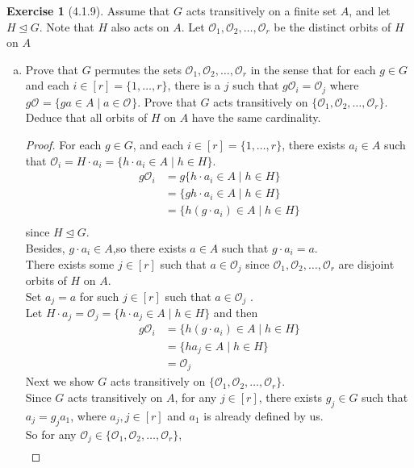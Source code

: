 \documentclass{amsart}
\theoremstyle{plain}
\theoremstyle{definition}
\newtheorem{exer}[lem]{Exercise}
\newcommand{\OO}[1]{\mathcal{O}_{#1}}
\begin{document}
\begin{exer}[4.1.9]
Assume that $G$ acts transitively on a finite set $A$, and let $H\unlhd G$.
Note that $H$ also acts on $A$. 
Let $\OO{1}, \OO 2,\ldots,\OO r$ be the distinct orbits of $H$ on $A$
\begin{enumerate}[(a)]
\item Prove that $G$ permutes the sets $\OO{1}, \OO 2,\ldots,\OO r$ in the sense that for each $g\in G$
and each $i\in[r]=\{1,\ldots,r\}$, there is a $j$ such that $g\OO i=\OO j$ where $g\OO{}=\{ga\in A\mid a\in\OO{}\}$.
Prove that $G$ acts transitively on $\{\OO{1}, \OO 2,\ldots,\OO r\}$. Deduce that all orbits of $H$ on $A$ have the same cardinality.

\begin{proof}
  For each $g \in G$, and each $i\in [r] = \{1,\ldots,r\}$, there exists $a_i \in A$ such that $\OO{i} = H\cdot a_i = \{h\cdot a_i\in A \mid h\in H\}$.
  \begin{align*}
  	g\OO i &= g\{h\cdot a_i \in A \mid h\in H\} \\ 
  		  &= \{gh\cdot a_i \in A \mid h \in H\} \\
  		  & = \{h(g \cdot a_i) \in A \mid h \in H\} \\
  \end{align*}
  since $H \unlhd G$.\\ 
  Besides, $g \cdot a_i \in A$,so there exists $a \in A$ such that $g\cdot a_i = a$.\\
  There exists some $j \in [r]$ such that $a \in \OO j$ since $\OO 1,\OO 2, \ldots, \OO r$ are disjoint orbits of $H$ on $A$.\\
  Set $a_j = a$ for such $j \in [r]$ such that $a \in \OO j$ .\\
  Let $H\cdot a_j = \OO j = \{h\cdot a_j\in A \mid h\in H\}$ and then 
  \begin{align*}
  	 g\OO i  & = \{h(g \cdot a_i) \in A \mid h \in H\} \\
  	 		 & = \{ha_j \in A \mid h \in H\} \\
  			 & = \OO j 
  \end{align*}
  Next we show $G$ acts transitively on $\{\OO 1,\OO 2,\ldots,\OO r\}$.\\
  Since $G$ acts transitively on $A$, for any $j \in [r]$, there exists $g_j \in G$ such that $a_j = g_ja_1$, where $a_j, j\in [r]$ and $a_1$ is already defined by us. \\
  So for any $\OO j \in \{\OO 1,\OO 2,\ldots,\OO r\}$, 
  \begin{align*}

\end{align*}
\end{proof}
\end{enumerate}
\end{exer}
\end{document}
